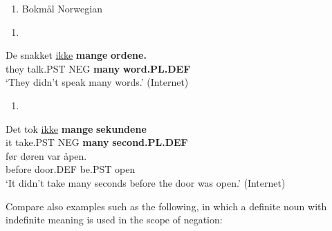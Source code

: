 \begin{enumerate} %
\item 
Bokmål Norwegian 

\end{enumerate} %
\setcounter{listLFOxcviiileveli}{0}
\begin{enumerate} %
\item 
\end{enumerate} %
\ea\label{}
\gll De  snakket  \href{http://kh.hd.uib.no/cgi-dos/roman-bm.bat?P55377C00#here}{ikke}  \textbf{mange}\textbf{  ordene.}\\


they  talk.PST  NEG  \textbf{many} \textbf{word.PL.DEF}\\ %


‘They didn’t speak many words.’ (Internet)
\z


\begin{enumerate} %
\item 
\end{enumerate} %
\ea\label{}
\gll Det  tok  \href{http://kh.hd.uib.no/cgi-dos/roman-bm.bat?P18543500#here}{ikke}  \textbf{mange} \textbf{sekundene}\\


it  take.PST  NEG  \textbf{many} \textbf{second.PL.DEF}\\ %


\ea\label{}
\gll før  døren  var  åpen.\\


before  door.DEF  be.PST  open\\ %


 ‘It didn’t take many seconds before the door was open.’ (Internet)
\z


Compare also examples such as the following, in which a definite noun with indefinite meaning is used in the scope of negation:

